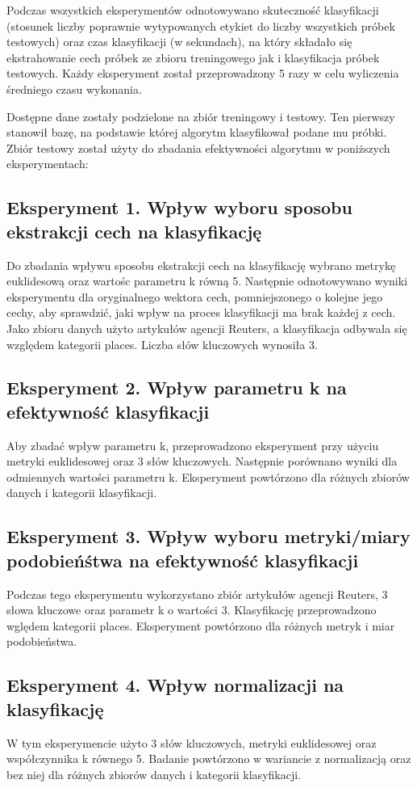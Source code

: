 \documentclass{classrep}
\begin{document}
Podczas wszystkich eksperymentów odnotowywano skuteczność klasyfikacji (stosunek liczby poprawnie wytypowanych etykiet do liczby wszystkich próbek testowych) oraz czas klasyfikacji (w sekundach), na który składało się ekstrahowanie cech próbek ze zbioru treningowego jak i klasyfikacja próbek testowych. Każdy eksperyment został przeprowadzony 5 razy w celu wyliczenia średniego czasu wykonania.

Dostępne dane zostały podzielone na zbiór treningowy i testowy. Ten pierwszy stanowił bazę, na podstawie której algorytm klasyfikował podane mu próbki. Zbiór testowy został użyty do zbadania efektywności algorytmu w poniższych eksperymentach:
\subsection{Eksperyment 1. Wpływ wyboru sposobu ekstrakcji cech na klasyfikację}
Do zbadania wpływu sposobu ekstrakcji cech na klasyfikację wybrano metrykę euklidesową oraz wartośc parametru k równą 5. Następnie odnotowywano wyniki eksperymentu dla oryginalnego wektora cech, pomniejszonego o kolejne jego cechy, aby sprawdzić, jaki wpływ na proces klasyfikacji ma brak każdej z cech. Jako zbioru danych użyto artykułów agencji Reuters, a klasyfikacja odbywała się względem kategorii places. Liczba słów kluczowych wynosiła 3.
\subsection{Eksperyment 2. Wpływ parametru k na efektywność klasyfikacji}
Aby zbadać wpływ parametru k, przeprowadzono eksperyment przy użyciu metryki euklidesowej oraz 3 słów kluczowych. Następnie porównano wyniki dla odmiennych wartości parametru k. Eksperyment powtórzono dla różnych zbiorów danych i kategorii klasyfikacji. 
\subsection{Eksperyment 3. Wpływ wyboru metryki/miary podobieńśtwa na efektywność klasyfikacji}
Podczas tego eksperymentu wykorzystano zbiór artykułów agencji Reuters, 3 słowa kluczowe oraz parametr k o wartości 3. Klasyfikację przeprowadzono wględem kategorii places. Eksperyment powtórzono dla różnych metryk i miar podobieństwa.
\subsection{Eksperyment 4. Wpływ normalizacji na klasyfikację}
W tym eksperymencie użyto 3 słów kluczowych, metryki euklidesowej oraz współczynnika k równego 5. Badanie powtórzono w wariancie z normalizacją oraz bez niej dla różnych zbiorów danych i kategorii klasyfikacji.
\end{document}
